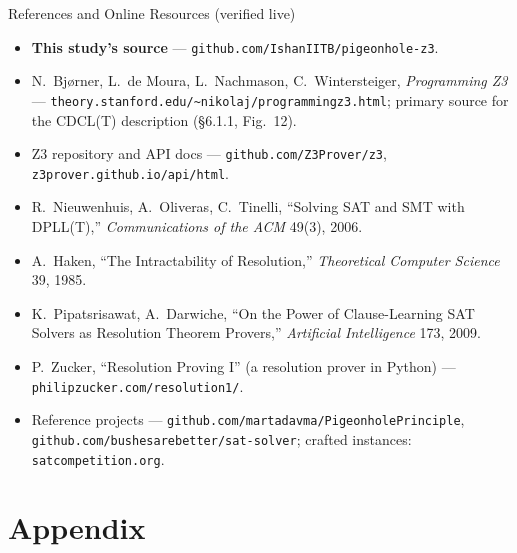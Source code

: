 \documentclass[10pt,aspectratio=169,xcolor={table}]{beamer}
\begin{document}
\begin{frame}{References and Online Resources (verified live)}
  \footnotesize
  \begin{itemize}\itemsep2pt
    \item \textbf{This study's source} ---
          \texttt{github.com/IshanIITB/pigeonhole-z3}.
    \item N.~Bj{\o}rner, L.~de Moura, L.~Nachmason,
          C.~Wintersteiger, \emph{Programming Z3} ---
          \texttt{theory.stanford.edu/\textasciitilde{}nikolaj/programmingz3.html};
          primary source for the CDCL(T) description (\S6.1.1,
          Fig.~12).
    \item Z3 repository and API docs ---
          \texttt{github.com/Z3Prover/z3},
          \texttt{z3prover.github.io/api/html}.
    \item R.~Nieuwenhuis, A.~Oliveras, C.~Tinelli, ``Solving SAT
          and SMT with DPLL(T),'' \emph{Communications of the
          ACM} 49(3), 2006.
    \item A.~Haken, ``The Intractability of Resolution,''
          \emph{Theoretical Computer Science} 39, 1985.
    \item K.~Pipatsrisawat, A.~Darwiche, ``On the Power of
          Clause-Learning SAT Solvers as Resolution Theorem
          Provers,'' \emph{Artificial Intelligence} 173, 2009.
    \item P.~Zucker, ``Resolution Proving I'' (a resolution prover
          in Python) --- \texttt{philipzucker.com/resolution1/}.
    \item Reference projects ---
          \texttt{github.com/martadavma/PigeonholePrinciple},
          \texttt{github.com/bushesarebetter/sat-solver};
          crafted instances: \texttt{satcompetition.org}.
  \end{itemize}
\end{frame}

\section*{Appendix}
\end{document}
